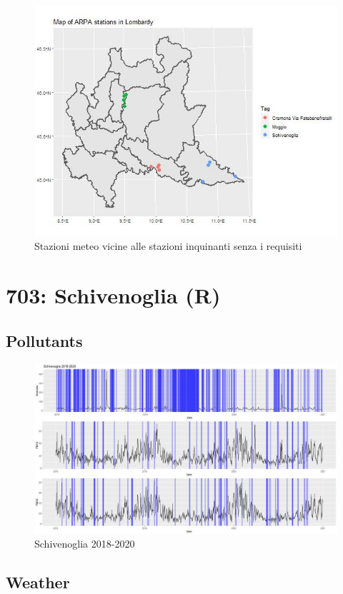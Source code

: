 \documentclass{article}
\begin{document}
\begin{figure}[H]
  \centering
  \includegraphics[scale = 0.4]{Picture/WStationsOfInterest.jpeg}
  \caption{Stazioni meteo vicine alle stazioni inquinanti senza i requisiti}
\end{figure}

\section{703: Schivenoglia (R)}
\subsection{Pollutants}
\begin{figure}[H]
  \centering
  \includegraphics[scale = 0.4]{Picture/Schivenoglia 2018-2020.jpeg}
  \caption{Schivenoglia 2018-2020}
  \centering
\end{figure}
\subsection{Weather}
\end{document}
